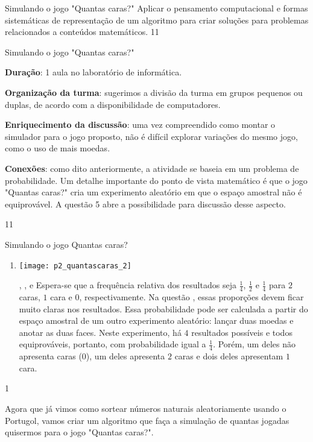 \label{comp-exp9}
\begin{objectives}{Simulando o jogo "Quantas caras?"}
{
Aplicar o pensamento computacional e formas sistemáticas de representação de um algoritmo para criar soluções para problemas relacionados a conteúdos matemáticos.
}{1}{1}
\end{objectives}
\begin{sugestions}{Simulando o jogo "Quantas caras?"}
{
\textbf{Duração}: 1 aula no laboratório de informática.

\textbf{Organização da turma}: sugerimos a divisão da turma em grupos pequenos ou duplas, de acordo com a disponibilidade de computadores.

\textbf{Enriquecimento da discussão}: uma vez compreendido como montar o simulador para o jogo proposto, não é difícil explorar variações do mesmo jogo, como o uso de mais moedas.

\textbf{Conexões}: como dito anteriormente, a atividade se baseia em um problema de probabilidade. Um detalhe importante do ponto de vista matemático é que o jogo "Quantas caras?"{} cria um experimento aleatório em que o espaço amostral não é equiprovável. A questão 5 abre a possibilidade para discussão desse aspecto.
}{1}{1}
\end{sugestions}
\begin{answer}{Simulando o jogo Quantas caras?}
{
\begin{enumerate}[wide]
\item {}
{
\texttt{[image: p2\_quantascaras\_2]}
}
\item[\titem{b)}, \titem{c)}, \titem{d)} e \titem{e)}]
Espera-se que a frequência relativa dos resultados seja $\frac{1}{4}$, $\frac{1}{2}$ e $\frac{1}{4}$ para $2$ caras, $1$ cara e $0$, respectivamente. Na questão , essas proporções devem ficar muito claras nos resultados. Essa probabilidade pode ser calculada a partir do espaço amostral de um outro experimento aleatório: lançar duas moedas e anotar as duas faces. Neste experimento, há $4$ resultados possíveis e todos equiprováveis, portanto, com probabilidade igual a $\frac{1}{4}$. Porém, um deles não apresenta caras ($0$), um deles apresenta $2$ caras e dois deles apresentam $1$ cara.
\end{enumerate}
}{1}
\end{answer}

Agora que já vimos como sortear números naturais aleatoriamente usando o Portugol, vamos criar um algoritmo que faça a simulação de quantas jogadas quisermos para o jogo "Quantas caras?".

